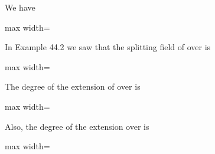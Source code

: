 \documentclass[11pt,oneside]{article}
\begin{document}
\begin{BookBody}

We have

\begin{center}\begin{adjustbox}{max width=\linewidth}\end{adjustbox}\end{center} \BookEnd{\blacklozenge}

 In Example 44.2 we saw that the splitting field of  over  is

\begin{center}\begin{adjustbox}{max width=\linewidth}\end{adjustbox}\end{center}

The degree of the extension of  over  is

\begin{center}\begin{adjustbox}{max width=\linewidth}\end{adjustbox}\end{center}

Also, the degree of the extension  over  is

\begin{center}\begin{adjustbox}{max width=\linewidth}\end{adjustbox}\end{center}


\end{BookBody}
\end{document}
